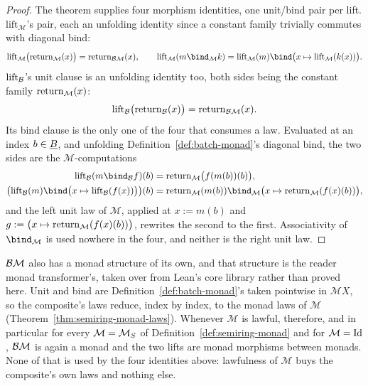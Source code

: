 \begin{proof}
\leanok
The theorem supplies four morphism identities, one unit/bind pair per
lift.
$\mathrm{lift}_{\mathcal M}$'s pair, each an unfolding identity since a
constant family trivially commutes with diagonal bind:
\[
  \mathrm{lift}_{\mathcal M}\bigl(\Ret_{\mathcal M}(x)\bigr) = \Ret_{\Bmon\mathcal M}(x),
  \qquad
  \mathrm{lift}_{\mathcal M}(m \bind_{\mathcal M} k) =
  \mathrm{lift}_{\mathcal M}(m) \bind \bigl(x \mapsto \mathrm{lift}_{\mathcal M}(k(x))\bigr).
\]
$\mathrm{lift}_{\mathcal B}$'s unit clause is an unfolding identity too, both
sides being the constant family $\mathrm{return}_{\mathcal M}(x)$:
\[
  \mathrm{lift}_{\mathcal B}\bigl(\mathrm{return}_{\mathcal B}(x)\bigr) = \mathrm{return}_{\mathcal B\mathcal M}(x).
\]
Its bind clause is the only one of the four that consumes a law.
Evaluated at an index $b \in \underline B$, and unfolding
Definition~\ref{def:batch-monad}'s diagonal bind, the two sides are the
$\mathcal M$-computations
\begin{align*}
  \mathrm{lift}_{\Bmon}(m \bind_{\Bmon} f)(b)
    &= \Ret_{\mathcal M}\bigl(f(m(b))(b)\bigr), \\
  \bigl(\mathrm{lift}_{\Bmon}(m) \bind
    \bigl(x \mapsto \mathrm{lift}_{\Bmon}(f(x))\bigr)\bigr)(b)
    &= \Ret_{\mathcal M}(m(b)) \bind_{\mathcal M}
       \bigl(x \mapsto \Ret_{\mathcal M}(f(x)(b))\bigr),
\end{align*}
and the left unit law of $\mathcal M$, applied at $x := m(b)$ and
$g := \bigl(x \mapsto \mathrm{return}_{\mathcal M}(f(x)(b))\bigr)$, rewrites the
second to the first. Associativity of $\bind_{\mathcal M}$ is used
nowhere in the four, and neither is the right unit law.
\end{proof}

$\mathcal B\mathcal M$ also has a monad structure of its own, and that
structure is the reader monad transformer's, taken over from Lean's
core library rather than proved here. Unit and bind are
Definition~\ref{def:batch-monad}'s taken pointwise in $\mathcal M X$,
so the composite's laws reduce, index by index, to the monad laws of
$\mathcal M$ (Theorem~\ref{thm:semiring-monad-laws}). Whenever
$\mathcal M$ is lawful, therefore, and in particular for every
$\mathcal M = \mathcal M_{S}$ of Definition~\ref{def:semiring-monad} and for
$\mathcal M = \mathrm{Id}$, $\mathcal B\mathcal M$ is again a monad and the two
lifts are monad morphisms between monads. None of that is used by the
four identities above: lawfulness of $\mathcal M$ buys the composite's
own laws and nothing else.

